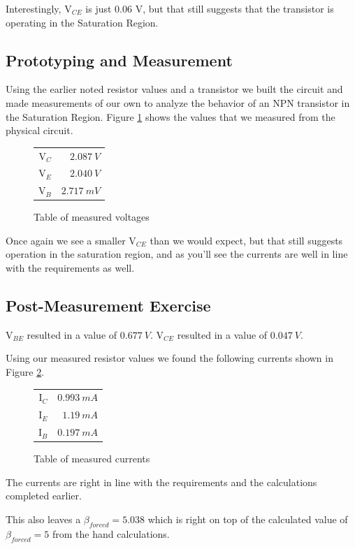 \documentclass{article}
\begin{document}
Interestingly, V$_{CE}$ is just 0.06 V, but 
that still suggests that the transistor is
operating in the Saturation Region.

\subsection{Prototyping and Measurement}

Using the earlier noted resistor values and a transistor
we built the circuit and made measurements of our own
to analyze the behavior of an NPN transistor in the
Saturation Region. Figure \ref{table:satTableMeas} shows
the values that we measured from the physical circuit.

\begin{figure}[h!]
  \begin{center}
    \begin{tabular}{r|r}
      V$_C$ & $\SI{2.087}{V}$ \\
      V$_E$ & $\SI{2.040}{V}$ \\
      V$_B$ & $\SI{2.717}{mV}$ \\

    \end{tabular}
  \end{center}
  \caption{Table of measured voltages}
  \label{table:satTableMeas}
\end{figure}

Once again we see a smaller V$_{CE}$ than we would
expect, but that still suggests operation in 
the saturation region, and as you'll see the currents
are well in line with the requirements as well.

\subsection{Post-Measurement Exercise}

V$_{BE}$ resulted in a value of $\SI{0.677}{V}$.
V$_{CE}$ resulted in a value of $\SI{0.047}{V}$.

Using our measured resistor values we found 
the following currents shown in Figure
\ref{table:satTableMeasCurrent}.

\begin{figure}[h!]
  \begin{center}
    \begin{tabular}{r|r}
      I$_C$ & $\SI{0.993}{mA}$ \\
      I$_E$ & $\SI{1.19}{mA}$ \\
      I$_B$ & $\SI{0.197}{mA}$ \\

    \end{tabular}
  \end{center}
  \caption{Table of measured currents}
  \label{table:satTableMeasCurrent}
\end{figure}

The currents are right in line with the requirements
and the calculations completed earlier.

This also leaves a $\beta_{forced}=5.038$ which is 
right on top of the calculated value of $\beta_{forced}=5$
from the hand calculations.
\end{document}
